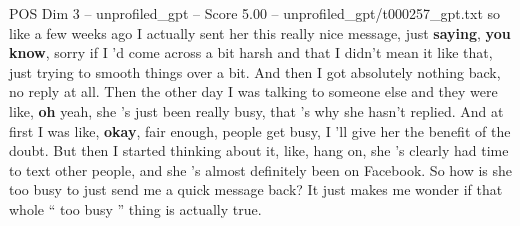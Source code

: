 \begin{textsample}{POS Dim 3 – unprofiled\_gpt – Score 5.00 – unprofiled\_gpt/t000257\_gpt.txt}  \label{ex:f3_pos_038}
so like a few weeks ago I actually sent her this really nice message, just \textbf{saying}, \textbf{you} \textbf{know}, sorry if I 'd come across a bit harsh and that I didn't mean it like that, just trying to smooth things over a bit.
And then I got absolutely nothing back, no reply at all.
Then the other day I was talking to someone else and they were like, \textbf{oh} yeah, she ’s just been really busy, that ’s why she hasn't replied.
And at first I was like, \textbf{okay}, fair enough, people get busy, I ’ll give her the benefit of the doubt.
But then I started thinking about it, like, hang on, she ’s clearly had time to text other people, and she ’s almost definitely been on Facebook.
So how is she too busy to just send me a quick message back?
It just makes me wonder if that whole “ too busy ” thing is actually true.

\end{textsample}
